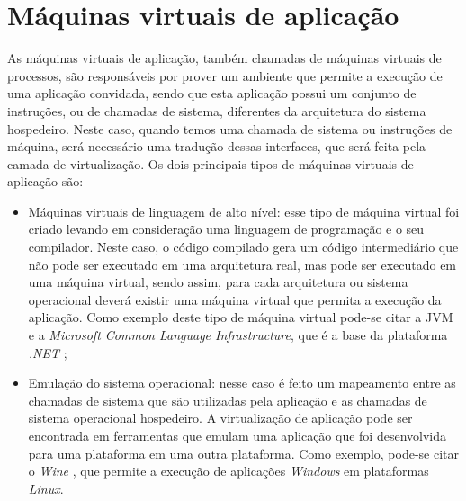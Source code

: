 \section{Máquinas virtuais de aplicação}
\label{section:virtaplicacao}

As máquinas virtuais de aplicação, também chamadas de máquinas virtuais de processos, são responsáveis por prover um ambiente que permite 
a execução de uma aplicação convidada, sendo que esta aplicação possui um conjunto de instruções, ou de chamadas de sistema, diferentes da 
arquitetura do sistema hospedeiro. Neste caso, quando temos uma chamada de sistema ou instruções de máquina, será necessário uma 
tradução dessas interfaces, que será feita pela camada de virtualização. Os dois principais tipos de máquinas virtuais de aplicação são:

\begin{itemize}
 \item Máquinas virtuais de linguagem de alto nível: esse tipo de máquina virtual foi criado levando em consideração uma linguagem de 
 programação e o seu compilador. Neste caso, o código compilado gera um código intermediário que não pode ser executado em uma arquitetura real, 
 mas pode ser executado em uma máquina virtual, sendo assim, para cada arquitetura ou sistema operacional deverá existir uma máquina virtual que
 permita a execução da aplicação. Como exemplo deste tipo de máquina virtual pode-se citar a \ac{JVM} e a 
 \textit{Microsoft Common Language Infrastructure}, que é a base da plataforma \textit{.NET} \cite{carissimi2008};
 \item Emulação do sistema operacional: nesse caso é feito um mapeamento entre as chamadas de sistema que são utilizadas pela aplicação e as 
 chamadas de sistema operacional hospedeiro. A virtualização de aplicação pode ser encontrada em ferramentas que emulam uma aplicação que foi
 desenvolvida para uma plataforma em uma outra plataforma. Como exemplo, pode-se citar o \textit{Wine} \cite{wine}, que permite a execução de 
 aplicações \textit{Windows} em plataformas \textit{Linux}.
\end{itemize}


